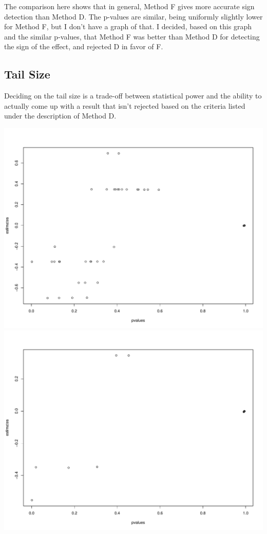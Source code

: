 \documentclass[11pt]{article} %
\begin{document}
The comparison here shows that in general, Method F gives more accurate sign detection than Method D. The p-values are similar, being uniformly slightly lower for Method F, but I don't have a graph of that. I decided, based on this graph and the similar p-values, that Method F was better than Method D for detecting the sign of the effect, and rejected D in favor of F.

\subsection{Tail Size}
Deciding on the tail size is a trade-off between statistical power and the ability to actually come up with a result that isn't rejected based on the criteria listed under the description of Method D.

\includegraphics[scale=0.25]{Method D 10Percent Tails.pdf}
\includegraphics[scale=0.25]{Method D 5Percent Tails.pdf}
\end{document}
